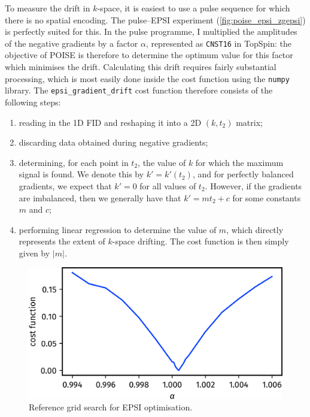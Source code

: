 To measure the drift in $k$-space, it is easiest to use a pulse sequence for which there is no spatial encoding.
The pulse--EPSI experiment (\cref{fig:poise_epsi_zgepsi}) is perfectly suited for this.
In the pulse programme, I multiplied the amplitudes of the negative gradients by a factor $\alpha$, represented as \texttt{CNST16} in TopSpin:
the objective of POISE is therefore to determine the optimum value for this factor which minimises the drift.
Calculating this drift requires fairly substantial processing, which is most easily done inside the cost function using the \texttt{numpy} library.
The \texttt{epsi\_gradient\_drift} cost function therefore consists of the following steps:
\begin{enumerate}
    \item reading in the 1D FID and reshaping it into a 2D $(k, t_2)$ matrix;
    \item discarding data obtained during negative gradients;
    \item determining, for each point in $t_2$, the value of $k$ for which the maximum signal is found.
        We denote this by $k' = k'(t_2)$, and for perfectly balanced gradients, we expect that $k' = 0$ for all values of $t_2$.
        However, if the gradients are imbalanced, then we generally have that $k' = mt_2 + c$ for some constants $m$ and $c$;
    \item performing linear regression to determine the value of $m$, which directly represents the extent of $k$-space drifting.
        The cost function is then simply given by $|m|$.
\end{enumerate}

\begin{figure}[htb]
    \centering
    \includegraphics[]{figures/poise/epsi_scan.png}%
    \caption[Reference grid search for EPSI optimisation]{
        Reference grid search for EPSI optimisation.
    }
    \label{fig:poise_epsi_scan}
\end{figure}

